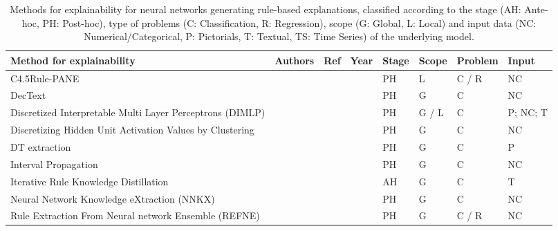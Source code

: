 \documentclass[final,1p,times]{elsarticle}
\begin{document}
\begin{table}[htbp]
\footnotesize
    \caption{Methods for explainability for neural networks generating rule-based explanations, classified according to the stage (AH: Ante-hoc, PH: Post-hoc), type of problems (C: Classification, R: Regression), scope (G: Global, L: Local) and input data (NC: Numerical/Categorical, P: Pictorials, T: Textual, TS: Time Series) of the underlying model.}
    \label{tab:neural-networks-rule}
    \begin{tabular}{m{4.2cm} m{2cm} m{0.5cm} m{0.5cm} m{0.5cm} m{0.6cm} m{0.8cm} m{1.1cm}}
    \hline
    Method for explainability & Authors & Ref & Year & Stage & Scope & Problem & Input\\
    \hline
    C4.5Rule-PANE &  \citeauthor{zhou2003medical} &  \cite{zhou2003medical} &  \citeyear{zhou2003medical} & PH & L & C / R & NC\\
    DecText &  \citeauthor{boz2002extracting} &  \cite{boz2002extracting} &  \citeyear{boz2002extracting} & PH & G & C & NC\\
    Discretized Interpretable Multi Layer Perceptrons (DIMLP) &  \citeauthor{bologna2017characterization,bologna2018rule} &  \cite{bologna2017characterization,bologna1998symbolic,bologna2018rule, bologna2018comparison} &  \citeyear{bologna2017characterization,bologna1998symbolic,bologna2018rule} & PH & G / L & C & P; NC; T\\
    Discretizing Hidden Unit Activation Values by Clustering &  \citeauthor{setiono1995understanding} &  \cite{setiono1995understanding} &  \citeyear{setiono1995understanding} & PH & G & C & NC\\
    DT extraction &  \citeauthor{frosst2017distilling,zhang2019interpreting} &  \cite{frosst2017distilling,zhang2019interpreting} &  \citeyear{frosst2017distilling,zhang2019interpreting} & PH & G & C & P\\
    Interval Propagation &  \citeauthor{palade2001interpretation} &  \cite{palade2001interpretation} &  \citeyear{palade2001interpretation} & PH & G & C & NC\\
    Iterative Rule Knowledge Distillation &  \citeauthor{hu2016harnessing} &  \cite{hu2016harnessing} &  \citeyear{hu2016harnessing} & AH & G & C & T\\
    Neural Network Knowledge eXtraction (NNKX) &  \citeauthor{bondarenko2017classification} &  \cite{bondarenko2017classification} &  \citeyear{bondarenko2017classification} & PH & G & C & NC\\
    Rule Extraction From Neural network Ensemble (REFNE) &  \citeauthor{zhou2003extracting} &  \cite{zhou2003extracting} &  \citeyear{zhou2003extracting} & PH & G & C / R & NC\\

\end{tabular}
\end{table}
\end{document}
